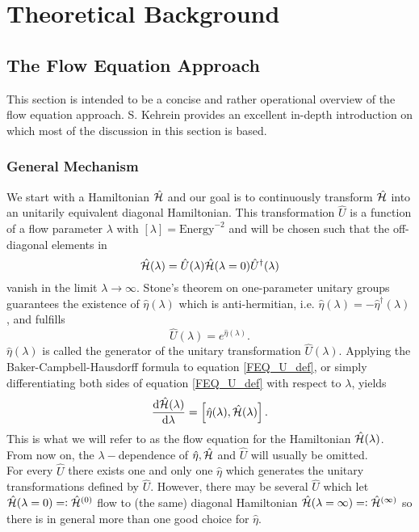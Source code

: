 \chapter{Theoretical Background}\label{Theoretical Background}
\section{The Flow Equation Approach}
This section is intended to be a concise and rather operational overview of the flow equation approach. S. Kehrein provides an excellent in-depth introduction \cite{kehrein2006flow} on which most of the discussion in this section is based.
\subsection{General Mechanism}\label{General Mechanism}
We start with a Hamiltonian $\hat{\mathcal{H}}$ and our goal is to continuously transform $\hat{\mathcal{H}}$ into an unitarily equivalent diagonal Hamiltonian. This transformation $\hat U$ is a function of a flow parameter $\lambda$ with $\left[\lambda\right]=\mathrm{Energy}^{-2}$ and will be chosen such that the off-diagonal elements in  
\begin{equation}\label{FEQ_U_def}
\hat{\mathcal{H}}(\lambda)=\hat U(\lambda)\hat{\mathcal{H}} (\lambda = 0)\hat U^\dagger (\lambda)
\end{equation}
vanish in the limit $\lambda\rightarrow\infty$. Stone's theorem on one-parameter unitary groups guarantees the existence of $\hat \eta(\lambda)$ which is anti-hermitian, i.e. $\hat\eta(\lambda) = -\hat\eta^\dagger(\lambda)$, and fulfills 
\begin{equation}
\hat U(\lambda) = e^{\hat\eta(\lambda)}.
\end{equation} 
$\hat\eta(\lambda)$ is called the generator of the unitary transformation $\hat U(\lambda)$. Applying the Baker-Campbell-Hausdorff formula to equation \ref{FEQ_U_def}, or simply differentiating both sides of equation \ref{FEQ_U_def} with respect to $\lambda$, yields
\begin{equation}\label{FEQ_ODE_def}
\frac{\mathrm d\hat{\mathcal{H}}(\lambda)}{\mathrm d\lambda} = \left[\hat\eta(\lambda),\hat{\mathcal{H}}(\lambda)\right].
\end{equation}
This is what we will refer to as the flow equation for the Hamiltonian $\hat{\mathcal{H}} (\lambda)$. From now on, the $\lambda-$dependence of $\hat\eta,\hat{\mathcal{H}}$ and $\hat U$ will usually be omitted. \\
For every $\hat U$ there exists one and only one $\hat\eta$ which generates the unitary transformations defined by $\hat U$. However, there may be several $\hat U$ which let $\hat{\mathcal{H}}(\lambda = 0)=\vcentcolon \hat{\mathcal{H}}^{(0)}$ flow to (the same) diagonal Hamiltonian $\hat{\mathcal{H}}(\lambda=\infty)=\vcentcolon \hat{\mathcal{H}}^{(\infty)}$ so there is in general more than one good choice for $\hat\eta$. \\

